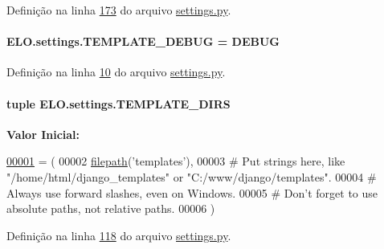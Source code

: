 Definição na linha \hyperlink{settings_8py_source_l00173}{173} do arquivo \hyperlink{settings_8py_source}{settings.\-py}.

\hypertarget{namespaceELO_1_1settings_a014930e0bf77feccc65c20212593381e}{
\paragraph[{T\-E\-M\-P\-L\-A\-T\-E\-\_\-\-D\-E\-B\-U\-G}]{\setlength{\rightskip}{0pt plus 5cm}E\-L\-O.\-settings.\-T\-E\-M\-P\-L\-A\-T\-E\-\_\-\-D\-E\-B\-U\-G = {\bf D\-E\-B\-U\-G}}}\label{namespaceELO_1_1settings_a014930e0bf77feccc65c20212593381e}


Definição na linha \hyperlink{settings_8py_source_l00010}{10} do arquivo \hyperlink{settings_8py_source}{settings.\-py}.

\hypertarget{namespaceELO_1_1settings_a4e977a41e98923ee4c93b24d22b3d7e2}{
\paragraph[{T\-E\-M\-P\-L\-A\-T\-E\-\_\-\-D\-I\-R\-S}]{\setlength{\rightskip}{0pt plus 5cm}tuple E\-L\-O.\-settings.\-T\-E\-M\-P\-L\-A\-T\-E\-\_\-\-D\-I\-R\-S}}\label{namespaceELO_1_1settings_a4e977a41e98923ee4c93b24d22b3d7e2}
{\bfseries Valor Inicial\-:}
\begin{DoxyCode}
\hypertarget{namespaceELO_1_1settings_l00001}{}\hyperlink{namespaceELO_1_1settings}{00001} = (
00002     \hyperlink{namespaceELO_1_1settings_a7730264ddd478343e0f282f36d4a5ab4}{filepath}(\textcolor{stringliteral}{'templates'}),
00003     \textcolor{comment}{# Put strings here, like "/home/html/django\_templates" or "C:/www/django/templates".}
00004     \textcolor{comment}{# Always use forward slashes, even on Windows.}
00005     \textcolor{comment}{# Don't forget to use absolute paths, not relative paths.}
00006 )
\end{DoxyCode}


Definição na linha \hyperlink{settings_8py_source_l00118}{118} do arquivo \hyperlink{settings_8py_source}{settings.\-py}.


